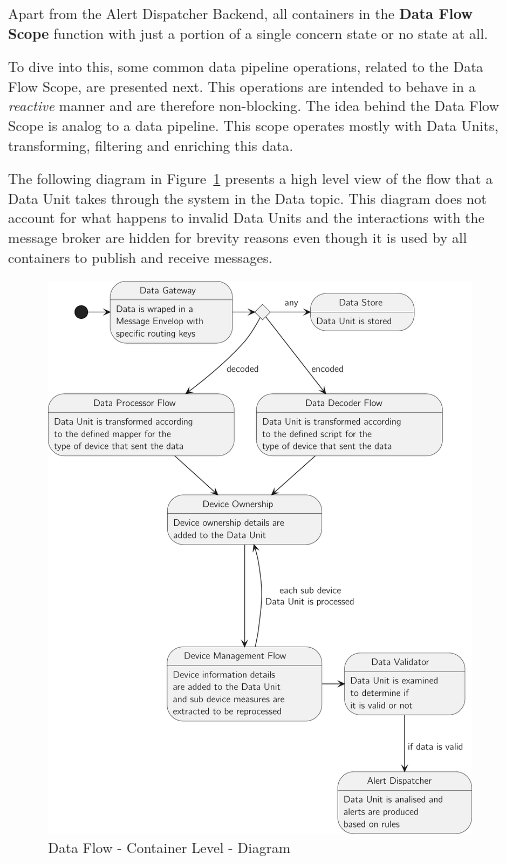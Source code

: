 Apart from the Alert Dispatcher Backend, all containers in the \textbf{Data Flow Scope} function with just a portion of a single concern state or no state at all.

To dive into this, some common data pipeline operations, related to the Data Flow Scope, are presented next. This operations are intended to behave in a \textit{reactive} manner \parencite{reactivemanifesto} and are therefore non-blocking. The idea behind the Data Flow Scope is analog to a data pipeline. This scope operates mostly with Data Units, transforming, filtering and enriching this data.

The following diagram in Figure~\ref{fig:design:architecture:platform:container:process:diagram:flow} presents a high level view of the flow that a Data Unit takes through the system in the Data topic. This diagram does not account for what happens to invalid Data Units and the interactions with the message broker are hidden for brevity reasons even though it is used by all containers to publish and receive messages.

\begin{figure}[H]
   \centering
   \includegraphics[page=1,width=0.8\columnwidth]{assets/diagrams/design/architectural/level2/process/data-flow-scope.pdf}
   \caption[Data Flow - Container Level - Diagram]{Data Flow - Container Level - Diagram}
   \label{fig:design:architecture:platform:container:process:diagram:flow}
\end{figure}

